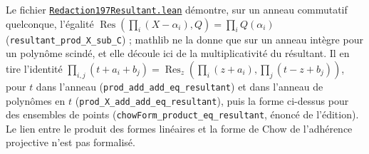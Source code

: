 \begin{sloppypar}
Le fichier \href{\leanblobmain/Redaction197Resultant.lean}{\texttt{Redaction197\allowbreak{}Resultant.\allowbreak{}lean}} démontre, sur un anneau commutatif quelconque, l'égalité $\operatorname{Res}(\prod_i (X - \alpha_i), Q) = \prod_i Q(\alpha_i)$ (\texttt{resultant\_prod\_X\_sub\_C}) ; mathlib ne la donne que sur un anneau intègre pour un polynôme scindé, et elle découle ici de la multiplicativité du résultant. Il en tire l'identité $\prod_{i,j} (t + a_i + b_j) = \operatorname{Res}_z(\prod_i (z + a_i), \prod_j (t - z + b_j))$, pour $t$ dans l'anneau (\texttt{prod\_add\_add\_eq\_resultant}) et dans l'anneau de polynômes en $t$ (\texttt{prod\_X\_add\_add\_eq\_resultant}), puis la forme ci-dessus pour des ensembles de points (\texttt{chowForm\_product\_eq\_resultant}, énoncé de l'édition). Le lien entre le produit des formes linéaires et la forme de Chow de l'adhérence projective n'est pas formalisé.
\end{sloppypar}

